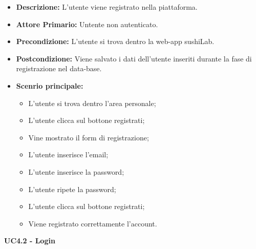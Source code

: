 \begin{itemize}
    \item \textbf{Descrizione:} L'utente viene registrato nella piattaforma.
    \item \textbf{Attore Primario:} Untente non autenticato.
    \item \textbf{Precondizione:} L'utente si trova dentro la web-app sushiLab.
    \item \textbf{Postcondizione:} Viene salvato i dati dell'utente inseriti durante la fase di registrazione nel data-base.
    \item \textbf{Scenrio principale:}
    \begin{itemize}
        \item L'utente si trova dentro l'area personale;
        \item L'utente clicca sul bottone registrati;
        \item Vine mostrato il form di registrazione;
        \item L'utente inserisce l'email;
        \item L'utente inserisce la password;
        \item L'utente ripete la password;
        \item L'utente clicca sul bottone registrati;
        \item Viene registrato correttamente l'account.
    \end{itemize}
\end{itemize}
\textbf{UC4.2 - Login}
